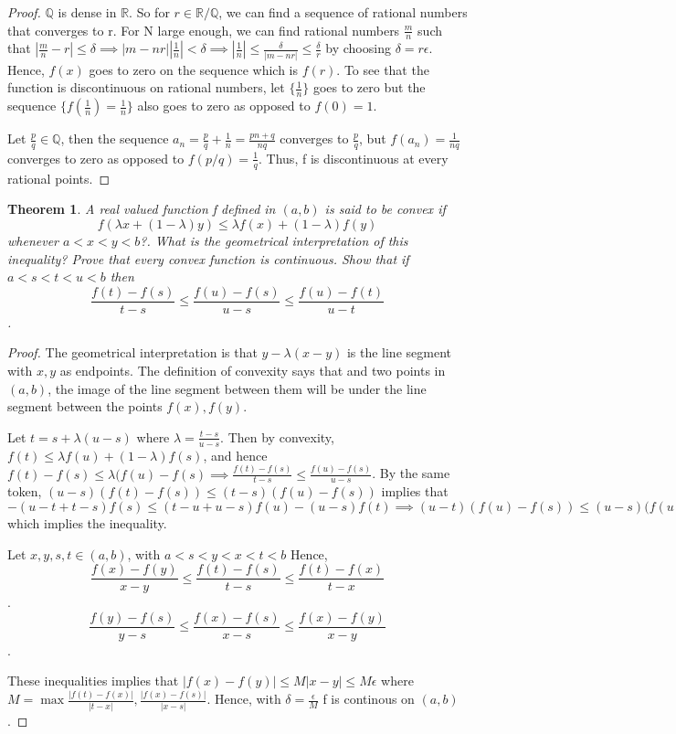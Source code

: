 \documentclass{article}
\theoremstyle{plain}
\newtheorem{theorem}{Theorem}
\theoremstyle{definition}
\begin{document}
 \begin{proof}
	 $\mathbb{Q}$ is dense in $\mathbb{R}$. So for $r \in \mathbb{R}/\mathbb{Q}$, we can find a sequence of rational numbers that converges to r. For N large enough, we can find rational numbers $\frac{m}{n}$ such that $|\frac{m}{n} - r| \leq \delta \implies |m - nr||\frac{1}{n}| < \delta \implies |\frac{1}{n}| \leq \frac{\delta}{|m - nr|} \leq \frac{\delta}{r}$ by choosing $\delta = r\epsilon$. Hence, $f(x)$ goes to zero on the sequence which is  $f(r)$. To see that the function is discontinuous on rational numbers, let $\{ \frac{1}{n} \}$ goes to zero but the sequence $\{ f(\frac{1}{n}) = \frac{1}{n}\}$ also goes to zero as opposed to $f(0) = 1$. 

	 Let $\frac{p}{q} \in \mathbb{Q}$, then the sequence $a_{n} = \frac{p}{q} + \frac{1}{n} = \frac{pn + q}{nq}$ converges to $\frac{p}{q}$, but $f(a_{n}) = \frac{1}{nq}$ converges to zero as opposed to $f(p/q) = \frac{1}{q}$. Thus, f is discontinuous at every rational points. 
 \end{proof}

 \begin{theorem}
	 A real valued function f defined in $(a,b)$ is said to be convex if $$f(\lambda x + (1-\lambda)y) \leq \lambda f(x) + (1 - \lambda)f(y) $$ whenever $a < x < y< b$?. What is the geometrical interpretation of this inequality? Prove that every convex function is continuous. Show that if $a < s < t < u < b$ then $$ \frac{f(t) - f(s)}{t - s} \leq \frac{f(u) - f(s)}{u - s} \leq \frac{f(u) - f(t)}{u - t}$$.
 \end{theorem}

 \begin{proof}
	 The geometrical interpretation is that $y - \lambda(x - y)$ is the line segment with $x,y$ as endpoints. The definition of convexity says that and two points in $(a,b)$, the image of the line segment between them will be under the line segment between the points $f(x), f(y)$. 

	 Let $t = s + \lambda(u - s)$ where $\lambda = \frac{t - s}{u - s}$. Then by convexity, $f(t) \leq \lambda f(u) + ( 1 - \lambda)f(s)$, and hence $ f(t) -  f(s) \leq \lambda(f(u) - f(s) \implies \frac{f(t) - f(s)}{t - s} \leq \frac{f(u) - f(s)}{u - s}$. By the same token, $(u - s)(f(t) - f(s)) \leq (t - s)(f(u) - f(s))$ implies that $-(u - t + t- s)f(s)\leq (t - u + u -s)f(u) - (u - s)f(t) \implies (u - t)(f(u) - f(s)) \leq (u - s)(f(u) - f(t)$which implies the inequality.

	 Let $x, y, s, t \in (a,b)$, with $a < s < y < x < t < b$ Hence, $$\frac{f(x) - f(y)}{x - y} \leq \frac{f(t) - f(s)}{t - s} \leq \frac{f(t) - f(x)}{t - x} $$. $$\frac{f(y) - f(s)}{y - s} \leq \frac{f(x) - f(s)}{x - s} \leq \frac{f(x) - f(y)}{x - y} $$.

	 These inequalities implies that $|f(x) - f(y)| \leq M|x - y| \leq M\epsilon$ where $M = \max{\frac{|f(t) - f(x)|}{|t - x|}, \frac{|f(x) - f(s)|}{|x - s|}}$. Hence, with $\delta = \frac{\epsilon}{M}$ f is continous on $(a,b)$. 
 \end{proof}
\end{document}
